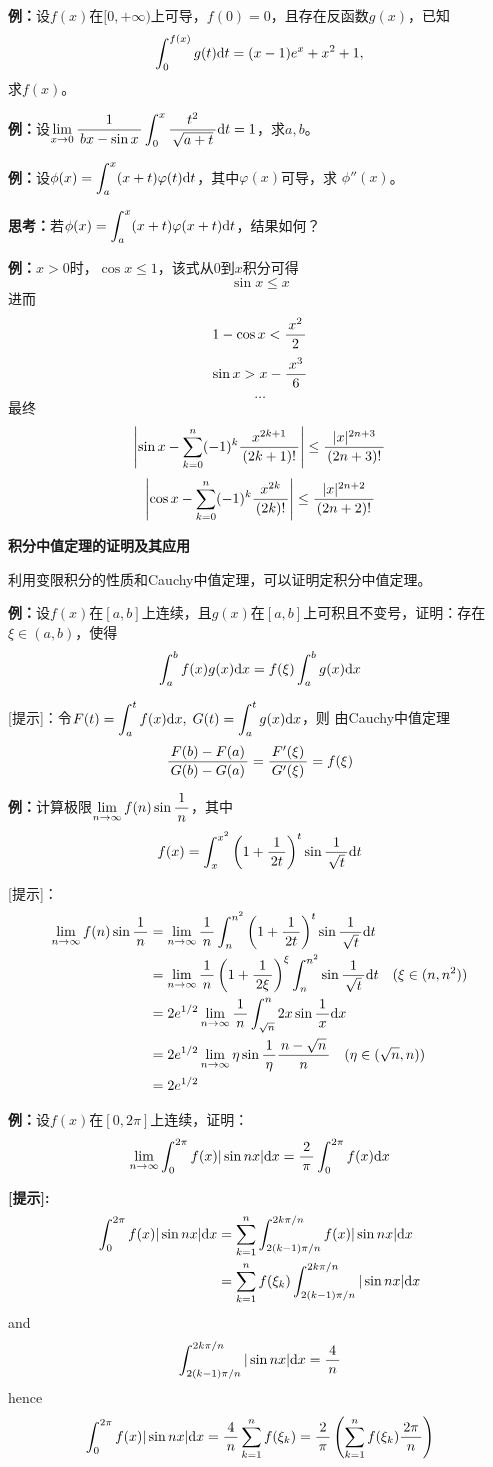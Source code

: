 {\bf 例：}设$f(x)$在$[0,+\infty)$上可导，$f(0)=0$，且存在反函数$g(x)$，已知
$$\dint_0^{f(x)}g(t)\d t=(x-1)e^x+x^2+1,$$
求$f(x)$。

{\bf 例：}设$\limx{0}\df{1}{bx-\sin
x}\dint_0^x\df{t^2}{\sqrt{a+t}}\d t=1$，求$a,b$。

{\bf 例：}设$\phi(x)=\dint_a^x(x+t)\varphi(t)\d t$，其中$\varphi(x)$可导，求
$\phi''(x)$。

{\bf 思考：}若$\phi(x)=\dint_a^x(x+t)\varphi(x+t)\d t$，结果如何？

{\bf 例：}$x>0$时，$\cos x\leq 1$，该式从$0$到$x$积分可得
$$\sin x\leq x$$
进而
$$1-\cos x<\df{x^2}2$$
$$\sin x>x-\df{x^3}6$$
$$\ldots$$
最终
$$\left|\sin x-\sum\limits_{k=0}^n(-1)^k\df{x^{2k+1}}{(2k+1)!}\right|
\leq\df{|x|^{2n+3}}{(2n+3)!}$$
$$\left|\cos x-\sum\limits_{k=0}^n(-1)^k\df{x^{2k}}{(2k)!}\right|
\leq\df{|x|^{2n+2}}{(2n+2)!}$$

\begin{shaded}
	{\bf 积分中值定理的证明及其应用}
	
	利用变限积分的性质和Cauchy中值定理，可以证明定积分中值定理。

	{\bf 例：}设$f(x)$在$[a,b]$上连续，且$g(x)$在$[a,b]$上可积且不变号，证明：存在
	$\xi\in(a,b)$，使得
	$$\dint_a^bf(x)g(x)\d x=f(\xi)\dint_a^bg(x)\d x$$
	
	[提示]：令$F(t)=\dint_a^tf(x)\d x,\;G(t)=\dint_a^tg(x)\d x$，则
	由Cauchy中值定理
	$$\df{F(b)-F(a)}{G(b)-G(a)}=\df{F'(\xi)}{G'(\xi)}=f(\xi)$$
	
	{\bf 例：}计算极限$\limn f(n)\sin\df 1n$，其中
	  $$f(x)=\dint_x^{x^2}\left(1+\df 1{2t}\right)^t\sin\df{1}{\sqrt t}\d t$$
	
	[提示]：
	\begin{align}
		\limn f(n)\sin\df 1n&=\limn\df1n\dint_n^{n^2}\left(1+\df
		1{2t}\right)^t\sin\df{1}{\sqrt t}\d t\notag\\
		&=\limn\df1n\left(1+\df1{2\xi}\right)^{\xi}\dint_n^{n^2}
		\sin\df1{\sqrt t}\d t\quad(\xi\in(n,n^2))\notag\\
		&=2e^{1/2}\limn\df1n\dint_{\sqrt n}^n2x\sin\df1x\d x\notag\\
		&=2e^{1/2}\limn\eta\sin\df1{\eta}\df{n-\sqrt n}n\quad(\eta\in(\sqrt
		n,n))\notag\\
		&=2e^{1/2}\notag
	\end{align}
	
	{\bf 例：}设$f(x)$在$[0,2\pi]$上连续，证明：
	$$\limn\dint_0^{2\pi}f(x)|\sin nx|\d x=\df 2{\pi}\dint_0^{2\pi}f(x)\d x$$
	
	{\bf [提示]:}
	\begin{align}
	\dint_0^{2\pi}f(x)|\sin nx|\d x
	&=\sum\limits_{k=1}^n\dint_{2(k-1)\pi/n}^{2k\pi/n}f(x)|\sin nx|\d x\notag\\
	&=\sum\limits_{k=1}^nf(\xi_k)\dint_{2(k-1)\pi/n}^{2k\pi/n}|\sin nx|\d x\notag
	\end{align}
	and
	$$\dint_{2(k-1)\pi/n}^{2k\pi/n}|\sin nx|\d x=\df4n$$
	hence
	$$\dint_0^{2\pi}f(x)|\sin nx|\d x=\df4n\sum\limits_{k=1}^nf(\xi_k)
	=\df2{\pi}\left(\sum\limits_{k=1}^nf(\xi_k)\df{2\pi}n\right)$$
\end{shaded}

